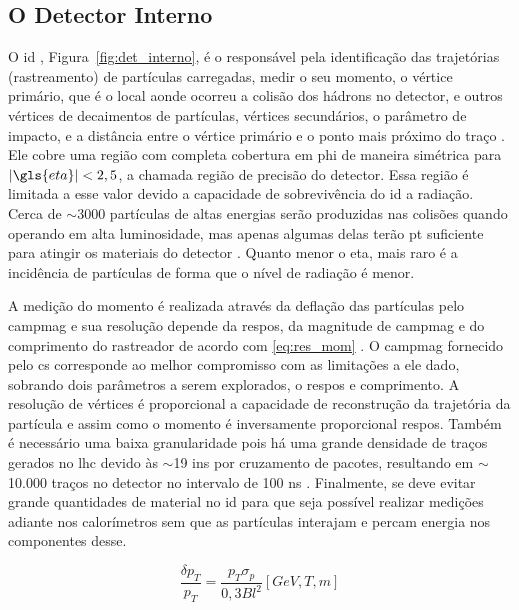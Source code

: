 \subsection{O Detector Interno}
\label{ssec:det_int}

O \gls{id} \cite{inner_tdr1,inner_tdr2}, Figura~\ref{fig:det_interno}, é o responsável pela identificação das 
trajetórias (rastreamento) de partículas carregadas, medir o seu momento, o
vértice primário, que é o local aonde ocorreu a colisão dos hádrons no detector, e outros
vértices de decaimentos de partículas, vértices secundários, o parâmetro de
impacto, e a distância entre o vértice primário e o ponto mais próximo do traço
\cite{tese_jatos,ATLAS_TDR}. Ele cobre uma região com completa cobertura em
\gls{phi} de maneira simétrica para $|\gls{eta}| < 2,5$, a chamada região de precisão
do detector. Essa região é limitada a esse valor devido 
a capacidade de sobrevivência do \gls{id} a radiação. 
Cerca de $\sim3000$ partículas de altas energias serão produzidas nas colisões
quando operando em alta luminosidade, mas apenas algumas delas terão \gls{pt}
suficiente para atingir os materiais do detector \cite{radiacao}. Quanto menor o \gls{eta},
mais raro é a incidência de partículas de forma que o nível de radiação é menor.

A medição do momento é realizada através da deflação das partículas pelo
\gls{campmag} e sua resolução depende da \gls{respos}, da magnitude de
\gls{campmag} e do \gls{comprimento} do rastreador de acordo com \ref{eq:res_mom}
\cite{lecture_slides_1,lecture_slides_2}. O \gls{campmag} fornecido pelo
\gls{cs} corresponde ao melhor compromisso com as limitações a ele dado,
sobrando dois parâmetros a serem explorados, o \gls{respos} e \gls{comprimento}. 
A resolução de vértices é proporcional a
capacidade de reconstrução da trajetória da partícula e assim como o momento
é inversamente proporcional \gls{respos}. 
Também é necessário uma baixa granularidade pois há uma grande densidade de
traços gerados no \gls{lhc} devido às  $\sim$19 \glspl{in} por cruzamento de pacotes,
resultando em $\sim$10.000 traços no detector no intervalo de 100 ns \cite{resumo_ATLAS}.
Finalmente, se deve evitar grande quantidades de material no \gls{id} 
para que seja possível realizar medições adiante nos calorímetros sem que as partículas 
interajam e percam energia nos componentes desse.

\begin{equation}\label{eq:res_mom}
\frac{\delta p_T}{p_T} = \frac{p_T \sigma_p}{0,3Bl^2} [GeV,T,m]
\end{equation}

